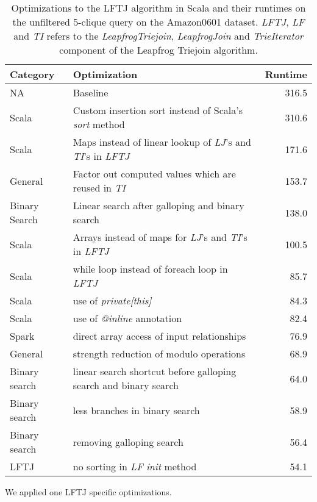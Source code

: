 \begin{table}
    \begin{tabular}{llr}
        \toprule
        Category & Optimization & Runtime \\ \midrule
        NA & Baseline     & 316.5   \\
        Scala & Custom insertion sort instead of Scala's \textit{sort} method & 310.6 \\
        Scala & Maps instead of linear lookup of \textit{LJ}'s and \textit{TI}'s in \textit{LFTJ} & 171.6 \\
        General & Factor out computed values which are reused in \textit{TI} & 153.7 \\
        Binary Search & Linear search after galloping and binary search & 138.0 \\
        Scala & Arrays instead of maps for \textit{LJ}'s and \textit{TI}'s in \textit{LFTJ} & 100.5 \\
        Scala & while loop instead of foreach loop in \textit{LFTJ} & 85.7 \\
        Scala & use of \textit{private[this]}                     & 84.3 \\
        Scala & use of \textit{@inline} annotation                & 82.4 \\
        Spark & direct array access of input relationships       & 76.9 \\
        General & strength reduction of modulo operations           & 68.9 \\
        Binary search & linear search shortcut before galloping search and binary search & 64.0 \\
        Binary search & less branches in binary search & 58.9 \\
        Binary search & removing galloping search      & 56.4 \\
        LFTJ          & no sorting in \textit{LF} \textit{init} method &  54.1 \\
        \bottomrule
    \end{tabular}
    \caption{Optimizations to the \textsc{LFTJ} algorithm in Scala and their runtimes on the unfiltered 5-clique query on
    the Amazon0601 dataset.
    \textit{LFTJ}, \textit{LF} and \textit{TI} refers to the \textit{LeapfrogTriejoin}, \textit{LeapfrogJoin}
    and \textit{TrieIterator} component of the Leapfrog Triejoin algorithm.
    }
    \label{table:lftj-optimizations}
\end{table}
We applied one \textsc{LFTJ} specific optimizations.

